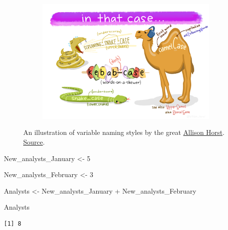 \documentclass[
  letterpaper,
  DIV=11,
  numbers=noendperiod]{scrartcl}
\newenvironment{Shaded}{\begin{snugshade}}{\end{snugshade}}
\newcommand{\DecValTok}[1]{\textcolor[rgb]{0.68,0.00,0.00}{#1}}
\newcommand{\NormalTok}[1]{\textcolor[rgb]{0.00,0.23,0.31}{#1}}
\newcommand{\OtherTok}[1]{\textcolor[rgb]{0.00,0.23,0.31}{#1}}
\newcommand{\SpecialCharTok}[1]{\textcolor[rgb]{0.37,0.37,0.37}{#1}}
\begin{document}
\begin{figure}

{\centering 

\begin{figure}

{\centering 

\href{https://allisonhorst.com/everything-else}{\includegraphics{IOwithR_files/mediabag/dbb99049-2916-4bc8-8.png}}

}

\end{figure}

}

\caption{\label{fig-style}An illustration of variable naming styles by
the great \href{https://allisonhorst.com/allison-horst}{Allison Horst}.
\href{https://allisonhorst.com/everything-else}{Source}.}

\end{figure}

\begin{Shaded}
\begin{Highlighting}[]
\NormalTok{New\_analysts\_January }\OtherTok{\textless{}{-}} \DecValTok{5}

\NormalTok{New\_analysts\_February }\OtherTok{\textless{}{-}} \DecValTok{3}

\NormalTok{Analysts }\OtherTok{\textless{}{-}}\NormalTok{ New\_analysts\_January }\SpecialCharTok{+}\NormalTok{ New\_analysts\_February}

\NormalTok{Analysts}
\end{Highlighting}
\end{Shaded}

\begin{verbatim}
[1] 8
\end{verbatim}
\end{document}

